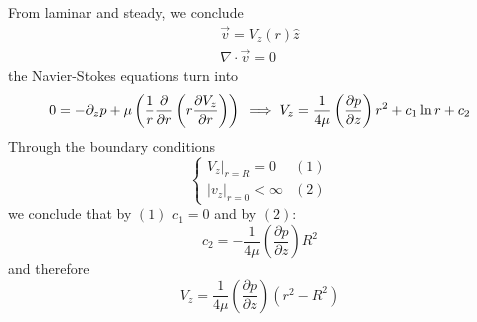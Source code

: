 From laminar and steady, we conclude
\begin{equation*}
	\begin{split}
		\vec v = V_z (r)\hat z\\
		\nabla \cdot \vec v = 0
	\end{split}
\end{equation*}
the Navier-Stokes equations turn into
\begin{equation*}
	0 = -\partial_zp + \mu \left(\frac 1r \frac{\partial }{\partial r}\left(r \frac{\partial V_z}{\partial r}\right)\right)\\
	\implies V_z = \frac{1}{4\mu}\left(\frac{\partial p}{\partial z}\right) r^2+ c_1\ln r + c_2
\end{equation*}
Through the boundary conditions
\begin{equation*}
	\begin{cases}
		V_z|_{r=R} = 0&(1)\\
		|v_z|_{r=0}< \infty &(2)
	\end{cases}
\end{equation*}
we conclude that by $(1)$ $c_1 = 0$ and by $(2)$:
\begin{equation*}
	c_2 = -\frac{1}{4\mu}\left(\frac{\partial p}{\partial z}\right)R^2
\end{equation*}
and therefore
\begin{equation*}
\boxed{	V_z = \frac{1}{4\mu}\left(\frac{\partial p}{\partial z}\right)(r^2-R^2)}
\end{equation*}